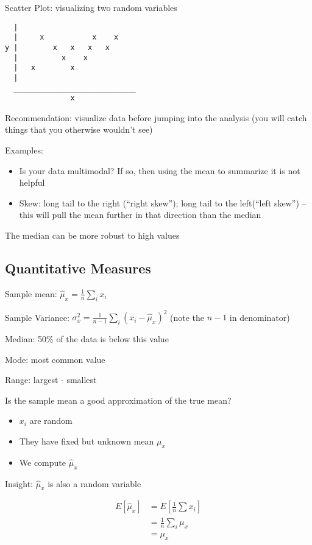 \documentclass[twoside]{article}
\begin{document}
Scatter Plot: visualizing two random variables

\begin{verbatim}
  | 
  |     x           x    x
y |        x   x   x   x 
  |          x    x
  |   x        x 
  |
  ____________________________
               x
\end{verbatim}

Recommendation: visualize data before jumping into the analysis (you will catch things that you otherwise wouldn't see)

Examples:
\begin{itemize}
\item Is your data multimodal? If so, then using the mean to summarize it is not helpful
\item Skew: long tail to the right (``right skew''); long tail to the left(``left skew'') -- this will pull the mean further in that direction than the median
\end{itemize}

The median can be more robust to high values

\subsection{Quantitative Measures}

Sample mean: $\hat{\mu}_x = \frac{1}{n} \sum\limits_i x_i$

Sample Variance: $\sigma_x^2 = \frac{1}{n-1} \sum\limits_i (x_i - \hat{\mu}_x)^2$ (note the $n-1$ in denominator)

Median: 50\% of the data is below this value

Mode: most common value

Range: largest - smallest

Is the sample mean a good approximation of the true mean?

\begin{itemize}
\item $x_i$ are random
\item They have fixed but unknown mean $\mu_x$
\item We compute $\hat{\mu}_x$
\end{itemize}

Insight: $\hat{\mu}_x$ is also a random variable

\begin{align}
E[\hat{\mu}_x] & = E[\frac{1}{n} \sum x_i] \\
& = \frac{1}{n} \sum\limits_i \mu_x \\
& = \mu_x
\end{align}
\end{document}
